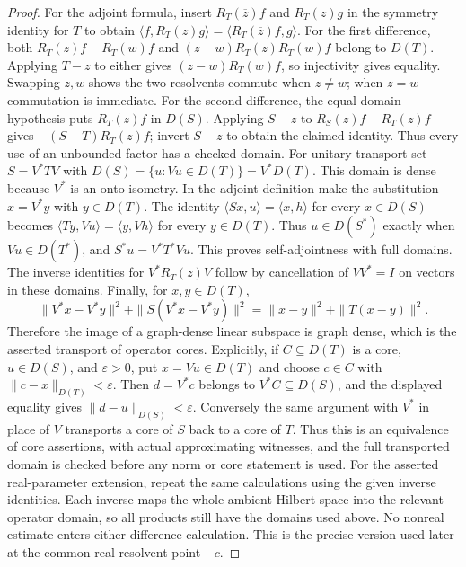 \documentclass[11pt,a4paper]{article}
\theoremstyle{definition}
\theoremstyle{remark}
\begin{document}
\begin{proof}
For the adjoint formula, insert $R_T(\overline z)f$ and $R_T(z)g$ in
the symmetry identity for $T$ to obtain
$\langle f,R_T(z)g\rangle=\langle R_T(\overline z)f,g\rangle$.
For the first difference, both $R_T(z)f-R_T(w)f$ and
$(z-w)R_T(z)R_T(w)f$ belong to $D(T)$. Applying $T-z$ to
either gives $(z-w)R_T(w)f$, so injectivity gives equality.
Swapping $z,w$ shows the two resolvents commute when $z\ne w$;
when $z=w$ commutation is immediate. For the second difference,
the equal-domain hypothesis puts $R_T(z)f$ in $D(S)$. Applying
$S-z$ to $R_S(z)f-R_T(z)f$ gives
$-(S-T)R_T(z)f$; invert $S-z$ to obtain the claimed identity.
Thus every use of an unbounded factor has a checked domain.
For unitary transport set $S=V^*TV$ with
$D(S)=\{u:Vu\in D(T)\}=V^*D(T)$. This domain is dense because
$V^*$ is an onto isometry. In the adjoint definition make the
substitution $x=V^*y$ with $y\in D(T)$. The identity
$\langle Sx,u\rangle=\langle x,h\rangle$ for every $x\in D(S)$
becomes $\langle Ty,Vu\rangle=\langle y,Vh\rangle$ for every
$y\in D(T)$. Thus $u\in D(S^*)$ exactly when $Vu\in D(T^*)$,
and $S^*u=V^*T^*Vu$. This proves self-adjointness with full domains.
The inverse identities for $V^*R_T(z)V$ follow by cancellation of
$VV^*=I$ on vectors in these domains. Finally, for $x,y\in D(T)$,
\[
 \|V^*x-V^*y\|^2+\|S(V^*x-V^*y)\|^2
 =\|x-y\|^2+\|T(x-y)\|^2.
\]
Therefore the image of a graph-dense linear subspace is graph dense,
which is the asserted transport of operator cores.
Explicitly, if $C\subseteq D(T)$ is a core, $u\in D(S)$, and
$\varepsilon>0$, put $x=Vu\in D(T)$ and choose $c\in C$ with
$\|c-x\|_{D(T)}<\varepsilon$. Then $d=V^*c$ belongs to
$V^*C\subseteq D(S)$, and the displayed equality gives
$\|d-u\|_{D(S)}<\varepsilon$. Conversely the same argument with
$V^*$ in place of $V$ transports a core of $S$ back to a core of
$T$. Thus this is an equivalence of core assertions, with actual
approximating witnesses, and the full transported domain is checked
before any norm or core statement is used.
For the asserted real-parameter extension, repeat the same calculations
using the given inverse identities. Each inverse maps the whole
ambient Hilbert space into the relevant operator domain, so all
products still have the domains used above. No nonreal estimate
enters either difference calculation. This is the precise version
used later at the common real resolvent point $-c$.
\end{proof}
\end{document}
